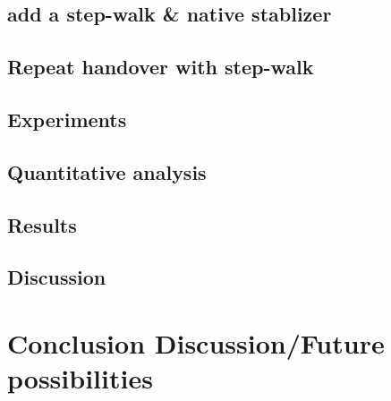 \documentclass[a4paper, 12pt, oneside]{Thesis}  %
\begin{document}
\clearpage
\section{add a step-walk \& native stablizer}

\clearpage
\section{Repeat handover with step-walk}

\clearpage
\section{Experiments}

\clearpage
\section{Quantitative analysis}

\clearpage
\section{Results}

\clearpage
\section{Discussion}








\chapter{Conclusion Discussion/Future possibilities}
\end{document}
